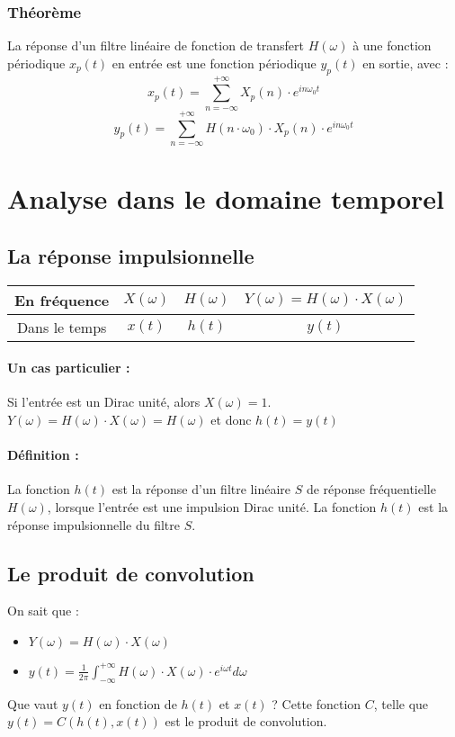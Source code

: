 \documentclass[10pt,a4paper,twoside]{article}
\begin{document}
\subsubsection{Théorème}
La réponse d'un filtre linéaire de fonction de transfert $H(\omega)$ à une fonction périodique $x_{p}(t)$ en entrée est une fonction périodique $y_{p}(t)$ en sortie, avec :
$$x_{p}(t)=\sum_{n=-\infty}^{+\infty} X_{p}(n)\cdot e^{in\omega_{0}t}$$
$$y_{p}(t)=\sum_{n=-\infty}^{+\infty} H(n\cdot\omega_{0})\cdot X_{p}(n)\cdot e^{in\omega_{0}t}$$

\section{Analyse dans le domaine temporel}
\subsection{La réponse impulsionnelle}
\begin{tabular}{c|ccc}
En fréquence & $X(\omega)$ & $H(\omega)$ & $Y(\omega)=H(\omega)\cdot X(\omega)$ \\ 
\hline 
Dans le temps & $x(t)$ & $h(t)$ & $y(t)$ \\ 
\end{tabular} 

\paragraph{Un cas particulier :} Si l'entrée est un Dirac unité, alors $X(\omega) = 1$. $Y(\omega)=H(\omega)\cdot X(\omega) = H(\omega)$ et donc $h(t)=y(t)$

\paragraph{Définition :} La fonction $h(t)$ est la réponse d'un filtre linéaire $S$ de réponse fréquentielle $H(\omega)$, lorsque l'entrée est une impulsion Dirac unité. La fonction $h(t)$ est la réponse impulsionnelle du filtre $S$.

\subsection{Le produit de convolution}
On sait que :
\begin{itemize}
\item $Y(\omega) = H(\omega)\cdot X(\omega)$
\item $y(t) = \frac{1}{2\pi} \int_{-\infty}^{+\infty} H(\omega)\cdot X(\omega)\cdot e^{i\omega t} d\omega$
\end{itemize}
Que vaut $y(t)$ en fonction de $h(t)$ et $x(t)$ ? Cette fonction $C$, telle que $y(t)=C(h(t),x(t))$ est le produit de convolution.
\end{document}
